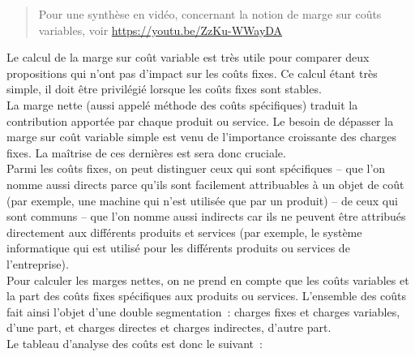 \documentclass{kaobook}
\begin{document}
\begin{quote}
Pour une synthèse en vidéo, concernant la notion de marge sur coûts variables, voir \url{https://youtu.be/ZzKu-WWayDA}\\
\end{quote}

Le calcul de la marge sur coût variable est très utile pour comparer deux propositions qui n'ont pas d'impact sur les coûts fixes. Ce calcul étant très simple, il doit être privilégié lorsque les coûts fixes sont stables.\\

La marge nette (aussi appelé méthode des coûts spécifiques) traduit la contribution apportée par chaque produit ou service. Le besoin de dépasser la marge sur coût variable simple est venu de l'importance croissante des charges fixes. La maîtrise de ces dernières est sera donc cruciale.\\

Parmi les coûts fixes, on peut distinguer ceux qui sont spécifiques – que l'on nomme aussi directs parce qu'ils sont facilement attribuables à un objet de coût (par exemple, une machine qui n'est utilisée que par un produit) – de ceux qui sont communs – que l'on nomme aussi indirects car ils ne peuvent être attribués directement aux différents produits et services (par exemple, le système informatique qui est utilisé pour les différents produits ou services de l'entreprise).\\

Pour calculer les marges nettes, on ne prend en compte que les coûts variables et la part des coûts fixes spécifiques aux produits ou services. L'ensemble des coûts fait ainsi l'objet d'une double segmentation : charges fixes et charges variables, d'une part, et charges directes et charges indirectes, d'autre part.\\

Le tableau d'analyse des coûts est donc le suivant :\\
\end{document}
